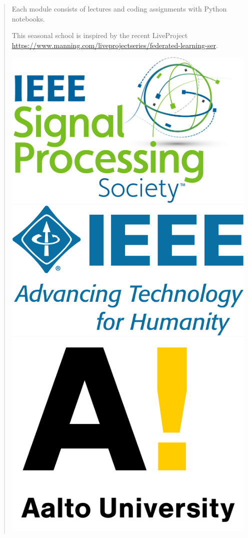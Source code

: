 \documentclass[12pt,epsf]{article}
\begin{document}
\begin{framed}
\begin{quote}
{Each module consists of lectures and coding assignments with Python notebooks.  

This seasonal school is inspired by the recent LiveProject \url{https://www.manning.com/liveprojectseries/federated-learning-ser}. 

\vspace*{10mm}
\includegraphics[height=0.07\paperheight]{SPS_Logo_Color_RGB}
\hspace*{10mm}
\includegraphics[height=0.07\paperheight]{ieeelogo}
\hspace*{10mm}
\includegraphics[height=0.07\paperheight]{aaltologo}
\vspace*{2mm}

}
\end{quote}
\end{framed}
\end{document}
